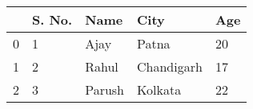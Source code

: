 \begin{tabular}{lllll}
\toprule
{} & S. No. &    Name &        City & Age \\
\midrule
0 &      1 &    Ajay &       Patna &  20 \\
1 &      2 &   Rahul &  Chandigarh &  17 \\
2 &      3 &  Parush &     Kolkata &  22 \\
\bottomrule
\end{tabular}
